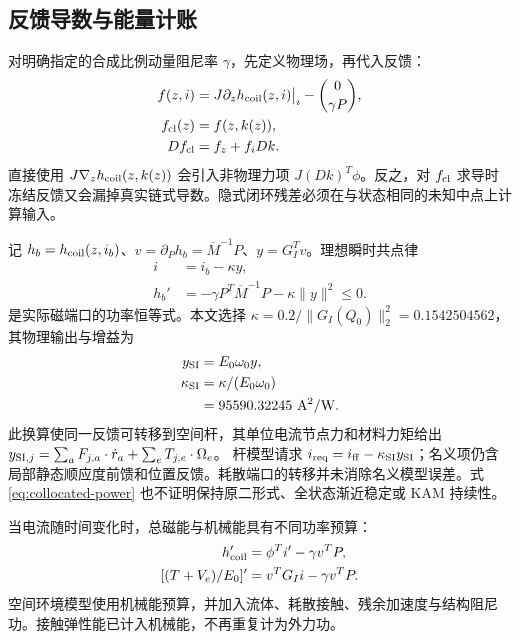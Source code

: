 \subsection{反馈导数与能量计账}
对明确指定的合成比例动量阻尼率 $\gamma$，先定义物理场，再代入反馈：
\begin{equation}
\begin{aligned}
 f(z,i)&=J\partial_z h_{\rm coil}(z,i)\big|_i-
 \binom{0}{\gamma P},\\
 f_{\rm cl}(z)&=f(z,k(z)),\\
 Df_{\rm cl}&=f_z+f_iDk.
\end{aligned}
 \label{eq:physical-feedback}
\end{equation}
直接使用 $J\nabla_z h_{\rm coil}(z,k(z))$ 会引入非物理力项 $J(Dk)^T\phi$。反之，对 $f_{\rm cl}$ 求导时冻结反馈又会漏掉真实链式导数。隐式闭环残差必须在与状态相同的未知中点上计算输入。

记 $h_b=h_{\rm coil}(z,i_b)$、$v=\partial_Ph_b=\overline M^{-1}P$、$y=G_I^Tv$。理想瞬时共点律
\begin{equation}
\begin{aligned}
 i&=i_b-\kappa y,\\
 h_b'&=-\gamma P^T\overline M^{-1}P-\kappa\|y\|^2\leq0.
\end{aligned}
 \label{eq:collocated-power}
\end{equation}
是实际磁端口的功率恒等式。本文选择 $\kappa=0.2/\|G_I(Q_0)\|_2^2=0.1542504562$，其物理输出与增益为
\begin{equation}
\begin{aligned}
 y_{\rm SI}&=E_0\omega_0y,\\
 \kappa_{\rm SI}&=\kappa/(E_0\omega_0)\\
 &=95590.32245\ {\rm A^2/W}.
\end{aligned}
 \label{eq:port-units}
\end{equation}
此换算使同一反馈可转移到空间杆，其单位电流节点力和材料力矩给出
$y_{{\rm SI},j}=\sum_aF_{j,a}\cdot\dot r_a+\sum_eT_{j,e}\cdot\Omega_e$。
杆模型请求 $i_{\rm req}=i_{\rm ff}-\kappa_{\rm SI}y_{\rm SI}$；名义项仍含局部静态顺应度前馈和位置反馈。耗散端口的转移并未消除名义模型误差。式 \eqref{eq:collocated-power} 也不证明保持原二形式、全状态渐近稳定或 KAM 持续性。

当电流随时间变化时，总磁能与机械能具有不同功率预算：
\begin{align}
 h_{\rm coil}'&=\phi^Ti'-\gamma v^TP,\label{eq:total-power}\\
 [(T+V_e)/E_0]'&=v^TG_Ii-\gamma v^TP.
 \label{eq:mechanical-power}
\end{align}
空间环境模型使用机械能预算，并加入流体、耗散接触、残余加速度与结构阻尼功。接触弹性能已计入机械能，不再重复计为外力功。


